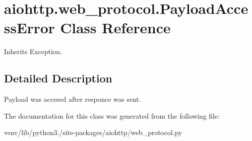 \hypertarget{classaiohttp_1_1web__protocol_1_1_payload_access_error}{}\section{aiohttp.\+web\+\_\+protocol.\+Payload\+Access\+Error Class Reference}
\label{classaiohttp_1_1web__protocol_1_1_payload_access_error}


Inherits Exception.



\subsection{Detailed Description}
\begin{DoxyVerb}Payload was accesed after responce was sent.\end{DoxyVerb}
 

The documentation for this class was generated from the following file\+:\begin{DoxyCompactItemize}
\item 
venv/lib/python3./site-\/packages/aiohttp/web\+\_\+protocol.\+py\end{DoxyCompactItemize}
